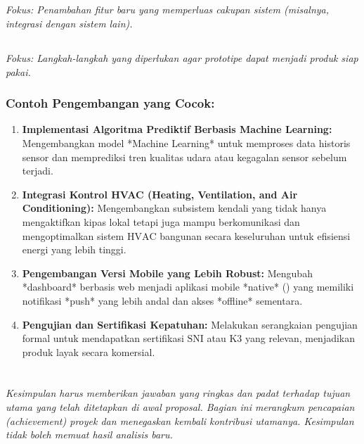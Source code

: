 \documentclass{elsinta}
\begin{document}
\subsection{\FunctionExpansionTitle}

\textit{Fokus: Penambahan fitur baru yang memperluas cakupan sistem (misalnya, integrasi dengan sistem lain).}

\subsection{\CommercializationTitle}

\textit{Fokus: Langkah-langkah yang diperlukan agar prototipe dapat menjadi produk siap pakai.}
\subsubsection*{Contoh Pengembangan yang Cocok:}
\begin{enumerate}
    \item \textbf{Implementasi Algoritma Prediktif Berbasis Machine Learning:} Mengembangkan model *Machine Learning* untuk memproses data historis sensor dan memprediksi tren kualitas udara atau kegagalan sensor sebelum terjadi.
    \item \textbf{Integrasi Kontrol HVAC (Heating, Ventilation, and Air Conditioning):} Mengembangkan subsistem kendali yang tidak hanya mengaktifkan kipas lokal tetapi juga mampu berkomunikasi dan mengoptimalkan sistem $\text{HVAC}$ bangunan secara keseluruhan untuk efisiensi energi yang lebih tinggi.
    \item \textbf{Pengembangan Versi Mobile yang Lebih Robust:} Mengubah *dashboard* berbasis web menjadi aplikasi mobile *native* () yang memiliki notifikasi *push* yang lebih andal dan akses *offline* sementara.
    \item \textbf{Pengujian dan Sertifikasi Kepatuhan:} Melakukan serangkaian pengujian formal untuk mendapatkan sertifikasi $\text{SNI}$ atau $\text{K3}$ yang relevan, menjadikan produk layak secara komersial.
\end{enumerate}

\section{\ConclusionTitle}

\textit{Kesimpulan harus memberikan jawaban yang ringkas dan padat terhadap tujuan utama yang telah ditetapkan di awal proposal. Bagian ini merangkum pencapaian (\emph{achievement}) proyek dan menegaskan kembali kontribusi utamanya. Kesimpulan tidak boleh memuat hasil analisis baru.}
\end{document}
